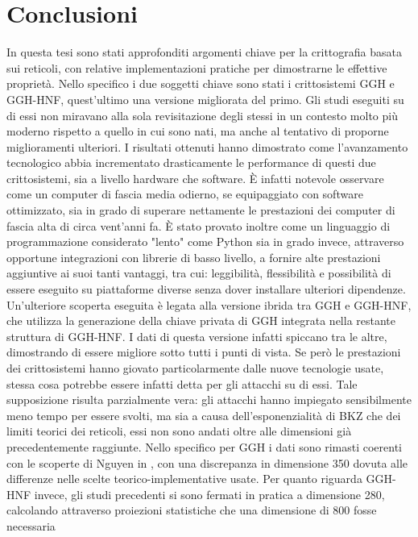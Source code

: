 \chapter{Conclusioni}

In questa tesi sono stati approfonditi argomenti chiave per la crittografia basata sui 
reticoli, con relative implementazioni pratiche per dimostrarne le effettive proprietà. 
Nello specifico i due soggetti chiave sono stati i crittosistemi GGH e GGH-HNF, quest'ultimo
una versione migliorata del primo. Gli studi eseguiti su di essi non miravano alla sola 
revisitazione degli stessi in un contesto molto più moderno rispetto a quello in cui sono 
nati, ma anche al tentativo di proporne miglioramenti ulteriori. I risultati ottenuti hanno 
dimostrato come l'avanzamento tecnologico abbia incrementato drasticamente le performance
di questi due crittosistemi, sia a livello hardware che software. È infatti notevole
osservare come un computer di fascia media odierno, se equipaggiato con software 
ottimizzato, sia in grado di superare nettamente le prestazioni dei computer di fascia 
alta di circa vent'anni fa. È stato provato inoltre come un linguaggio di programmazione
considerato "lento" come Python sia in grado invece, attraverso opportune integrazioni 
con librerie di basso livello, a fornire alte prestazioni aggiuntive ai suoi tanti vantaggi,
tra cui: leggibilità, flessibilità e possibilità di essere eseguito su piattaforme diverse 
senza dover installare ulteriori dipendenze. Un'ulteriore scoperta eseguita è legata 
alla versione ibrida tra GGH e GGH-HNF, che utilizza la generazione della chiave privata
di GGH integrata nella restante struttura di GGH-HNF. I dati di questa versione infatti 
spiccano tra le altre, dimostrando di essere migliore sotto tutti i punti di vista. 
Se però le prestazioni dei crittosistemi hanno giovato particolarmente dalle nuove tecnologie
usate, stessa cosa potrebbe essere infatti detta per gli attacchi su di essi. Tale supposizione risulta
parzialmente vera: gli attacchi hanno impiegato sensibilmente meno tempo per essere svolti, ma 
sia a causa dell'esponenzialità di BKZ che dei limiti teorici dei reticoli, essi non sono 
andati oltre alle dimensioni già precedentemente raggiunte. Nello specifico per GGH i dati 
sono rimasti coerenti con le scoperte di Nguyen in \cite{Nguyen99}, con una discrepanza 
in dimensione 350 dovuta alle differenze nelle scelte teorico-implementative usate. Per 
quanto riguarda GGH-HNF invece, gli studi precedenti si sono fermati in pratica a dimensione
280, calcolando attraverso proiezioni statistiche che una dimensione di 800 fosse necessaria 
